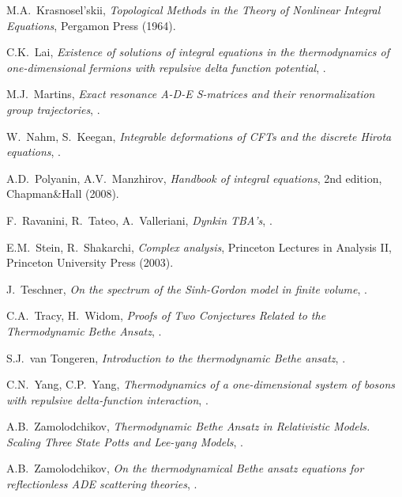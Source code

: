 \documentclass[12pt]{article}
\theoremstyle{plain}
\theoremstyle{definition}
\numberwithin{equation}{section}
\numberwithin{theorem}{section}
\begin{document}
\begin{thebibliography}{YYY}
M.A.~Krasnosel'skii,
{\it Topological Methods in the Theory of Nonlinear Integral Equations},
{Pergamon Press (1964)}.
  
  C.K.~Lai,
  {\it Existence of solutions of integral equations in the thermodynamics of one-dimensional
fermions with repulsive delta function potential},
  .

  M.J.~Martins,
  {\it Exact resonance A-D-E S-matrices and their renormalization group trajectories},
  .

  W.~Nahm, S.~Keegan,
  {\it Integrable deformations of CFTs and the discrete Hirota equations},
  .

  A.D.~Polyanin, A.V.~Manzhirov,
  {\it Handbook of integral equations},
  {2nd edition, Chapman\&Hall (2008)}.
  
  F.~Ravanini, R.~Tateo, A.~Valleriani,
  {\it Dynkin TBA's},
  .

  E.M.~Stein, R.~Shakarchi,
  {\it Complex analysis},
  {Princeton Lectures in Analysis II, Princeton University Press (2003)}.
  
  J.~Teschner,
  {\it On the  spectrum  of the  Sinh-Gordon  model  in finite  volume},
  .

  C.A.~Tracy, H.~Widom,
  {\it Proofs of Two Conjectures Related to the Thermodynamic Bethe Ansatz},
  .  
  
  S.J.~van Tongeren,
  {\it Introduction to the thermodynamic Bethe ansatz},
  .
  
  C.N.~Yang, C.P.~Yang,
  {\it Thermodynamics of a one-dimensional system of bosons with repulsive
delta-function interaction},
  .
  
  A.B.~Zamolodchikov,
  {\it Thermodynamic Bethe Ansatz in Relativistic Models. Scaling Three State Potts and Lee-yang Models},
  .
  
  A.B.~Zamolodchikov,
  {\it On the thermodynamical Bethe ansatz equations for reflectionless ADE scattering theories},
  .


\end{thebibliography}
\end{document}
